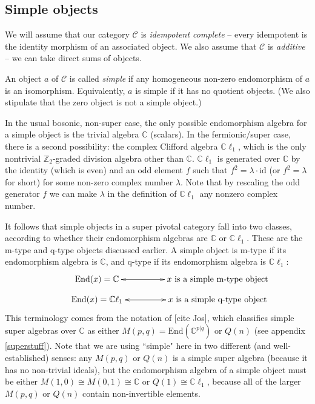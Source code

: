 \documentclass[12pt,a4paper]{article}
\newcommand{\cc}{\mathbb{C}}
\newcommand{\mcc}{\mathcal{C}}
\newcommand{\zt}{\mathbb{Z}_2}
\newcommand{\id}{\text{id}}
\newcommand{\End}{\text{End}}
\newcommand{\cl}{\mathbb{C}\ell}
\begin{document}
\subsection{Simple objects}  \label{def_sob_ss}

We will assume that our category $\mcc$ is {\it idempotent complete} -- 
every idempotent is the identity morphism of an associated object.
We also assume that $\mcc$ is {\it additive} -- we can take direct sums of objects.

An object $a$ of $\mcc$ is called {\it simple} if any homogeneous non-zero endomorphism of $a$ is an isomorphism.
Equivalently, $a$ is simple if it has no quotient objects.
(We also stipulate that the zero object is not a simple object.)

In the usual bosonic, non-super case, the only possible endomorphism algebra for a simple object
is the trivial algebra $\cc$ (scalars).
In the fermionic/super case, there is a second possibility: the complex Clifford algebra $\cl_1$, 
which is the only nontrivial $\zt$-graded division algebra other than $\cc$.
$\cl_1$ is generated over $\cc$ by the identity (which is even) and an odd element $f$ such that $f^2 = \lambda \cdot \id$
(or $f^2 = \lambda$ for short) for some non-zero complex number $\lambda$. 
Note that by rescaling the odd generator $f$ we can make $\lambda$ in the definition of $\cl_1$ any nonzero complex number. 

It follows that simple objects in a super pivotal category fall into two classes, according to whether their endomorphism algebras are $\cc$ or $\cl_1$. 
These are the m-type and q-type objects discussed earlier. 
A simple object is {m-type} if its endomorphism algebra
is $\cc$, and {q-type} if its endomorphism algebra is $\cl_1$:
\begin{align}
\vcenter{\xymatrix @!0 @M=1mm @C=25mm{
& \text{End}(x) = \mathbb{C} \ar@{<->}[rr] &   &\text{$x$ is a simple m-type object}&  \\
&\text{End}(x) = \mathbb{C} \ell_1 \ar@{<->}[rr]  &  &\text{$x$ is a simple q-type object}&
	}}
\end{align}
This terminology comes from the notation of [cite Jos], which classifies simple super algebras over $\cc$ as either
$M(p,q) = \End(\cc^{p|q})$ or $Q(n)$ (see appendix \ref{superstuff}).
Note that we are using ``simple" here in two different (and well-established) senses: 
any $M(p,q)$ or $Q(n)$ is a simple super algebra
(because it has no non-trivial ideals), but the endomorphism algebra of a simple object must be either
$M(1,0) \cong M(0,1) \cong \cc$ or $Q(1) \cong \cl_1$,
because all of the larger $M(p,q)$ or $Q(n)$ contain non-invertible elements.
\end{document}
